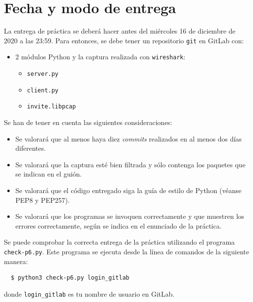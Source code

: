 \documentclass[a4paper,11pt]{article}
\begin{document}
\section*{Fecha y modo de entrega}

La entrega de práctica se deberá hacer antes del miércoles 16 de diciembre de 2020 a las 23:59. Para entonces, se debe tener un repositorio \texttt{git} en GitLab con: 

    \begin{itemize}
        \item 2 módulos Python y la captura realizada con \texttt{wireshark}:
    \begin{itemize}
      \item \texttt{server.py}
      \item \texttt{client.py}
      \item \texttt{invite.libpcap}
    \end{itemize}
\end{itemize}

Se han de tener en cuenta las siguientes consideraciones:
\begin{itemize}
  \item Se valorará que al menos haya diez \emph{commits} realizados en al menos dos días diferentes.
  \item Se valorará que la captura esté bien filtrada y sólo contenga los paquetes que se indican en el guión.
  \item Se valorará que el código entregado siga la guía de estilo de Python (véanse PEP8 y PEP257).
  \item Se valorará que los programas se invoquen correctamente y que muestren los errores correctamente, según se indica en el enunciado de la práctica.
\end{itemize}

Se puede comprobar la correcta entrega de la práctica utilizando el programa \texttt{check-p6.py}. Este programa se ejecuta desde la línea de comandos de la siguiente manera:
\begin{verbatim}
  $ python3 check-p6.py login_gitlab
\end{verbatim}


donde \texttt{login\_gitlab} es tu nombre de usuario en GitLab.


%
%
\end{document}
